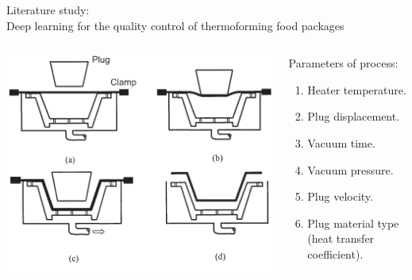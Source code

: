 \documentclass{beamer}
\begin{document}
	\begin{frame}{Literature study:\\Deep learning for the quality control of thermoforming food packages}
		\begin{columns}
			\begin{column}{0.5\textwidth}
				\begin{center}
					\includegraphics[width=\textwidth]{Figures/CupProcessNoExplenation.pdf}
				\end{center}
			\end{column}
			\begin{column}{0.5\textwidth}  %
				Parameters of process:
				\begin{enumerate}
					\item Heater temperature.
					\item Plug displacement.
					\item Vacuum time.
					\item Vacuum pressure.
					\item Plug velocity.
					\item Plug material type (heat transfer coefficient).
				\end{enumerate}
			\end{column}
		\end{columns}
	\end{frame}
\end{document}
